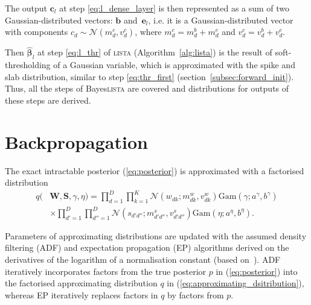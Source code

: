 \documentclass{article}
\begin{document}
  The output $\mathbf{c}_l$ at step \ref{eq:l_dense_layer} is then represented as a sum of two Gaussian-distributed vectors: $\mathbf{b}$ and~$\mathbf{e}_l$, i.e. it is a Gaussian-distributed vector with components $c_{d} \sim \mathcal{N}(m^c_{d}, v^c_{d})$, where $m^c_{d} = m^b_{d} + m^e_{d}$ and $v^c_{d} = v^b_{d} + v^e_{d}$.


  Then $\widehat{\boldsymbol\beta}_{l}$ at step \ref{eq:l_thr} of \textsc{lista} (Algorithm~\ref{alg:lista}) is the result of soft-thresholding of a Gaussian variable, which is approximated with the spike and slab distribution,  similar to step \ref{eq:thr_first} (section~\ref{subsec:forward_init}).
  Thus, all the steps of Bayes\textsc{lista} are covered and distributions for outputs of these steps are derived.

  \section{Backpropagation}
  \label{sec:backpropagation}

  The exact intractable posterior (\ref{eq:posterior}) is approximated with a factorised distribution
  \begin{align}
  q(&\mathbf{W}, \mathbf{S}, \gamma, \eta) = \prod_{d=1}^D\prod_{k=1}^K \mathcal{N}(w_{dk} ; m^w_{dk}, v^w_{dk}) \text{Gam}(\gamma; a^\gamma, b^\gamma)\nonumber\\
  \label{eq:approximating_dsitribution}
  &\times\prod_{d'=1}^D\prod_{d''=1}^D \mathcal{N}(s_{d'd''} ; m^s_{d'd''}, v^s_{d'd''}) \text{Gam}(\eta; a^\eta, b^\eta).
  \end{align}

  Parameters of approximating distributions are updated with the assumed density filtering (ADF) and expectation propagation (EP) algorithms derived on the derivatives of the logarithm of a normalisation constant (based on~\cite{hernandez2015probabilistic}). ADF iteratively incorporates factors from the true posterior $p$ in (\ref{eq:posterior}) into the factorised approximating distribution $q$ in (\ref{eq:approximating_dsitribution}), whereas EP iteratively replaces factors in $q$ by factors from $p$.
\end{document}
